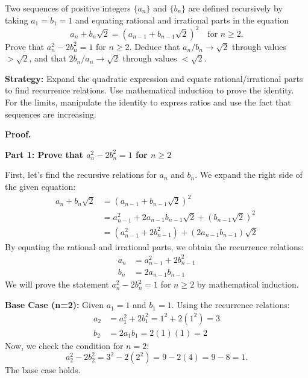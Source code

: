 \begin{problembox}
\begin{problemstatement}
Two sequences of positive integers $\{a_n\}$ and $\{b_n\}$ are defined recursively by taking $a_1 = b_1 = 1$ and equating rational and irrational parts in the equation
\[a_n + b_n \sqrt{2} = (a_{n-1} + b_{n-1} \sqrt{2})^2 \quad \text{for } n \geq 2.\]
Prove that $a_n^2 - 2b_n^2 = 1$ for $n \geq 2$. Deduce that $a_n/b_n \to \sqrt{2}$ through values $> \sqrt{2}$, and that $2b_n/a_n \to \sqrt{2}$ through values $< \sqrt{2}$.
\end{problemstatement}
\end{problembox}

\noindent\textbf{Strategy:} Expand the quadratic expression and equate rational/irrational parts to find recurrence relations. Use mathematical induction to prove the identity. For the limits, manipulate the identity to express ratios and use the fact that sequences are increasing.

\noindent\textbf{Proof.}

\textbf{Part 1: Prove that $a_n^2 - 2b_n^2 = 1$ for $n \geq 2$}

First, let's find the recursive relations for $a_n$ and $b_n$. We expand the right side of the given equation:
\begin{align*}
a_n + b_n \sqrt{2} &= (a_{n-1} + b_{n-1} \sqrt{2})^2 \\
&= a_{n-1}^2 + 2a_{n-1}b_{n-1}\sqrt{2} + (b_{n-1}\sqrt{2})^2 \\
&= (a_{n-1}^2 + 2b_{n-1}^2) + (2a_{n-1}b_{n-1})\sqrt{2}
\end{align*}
By equating the rational and irrational parts, we obtain the recurrence relations:
\begin{align}
a_n &= a_{n-1}^2 + 2b_{n-1}^2 \label{eq:an} \\
b_n &= 2a_{n-1}b_{n-1} \label{eq:bn}
\end{align}
We will prove the statement $a_n^2 - 2b_n^2 = 1$ for $n \geq 2$ by mathematical induction.

\textbf{Base Case (n=2):}
Given $a_1 = 1$ and $b_1 = 1$. Using the recurrence relations:
\begin{align*}
a_2 &= a_1^2 + 2b_1^2 = 1^2 + 2(1^2) = 3 \\
b_2 &= 2a_1b_1 = 2(1)(1) = 2
\end{align*}
Now, we check the condition for $n=2$:
\[ a_2^2 - 2b_2^2 = 3^2 - 2(2^2) = 9 - 2(4) = 9 - 8 = 1. \]
The base case holds.

